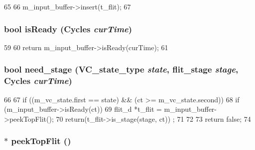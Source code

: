 \begin{DoxyCode}
65     {
66         m_input_buffer->insert(t_flit);
67     }
\end{DoxyCode}
\hypertarget{classVirtualChannel__d_ae19b07af91a49435139ba13f5665b239}{
\subsubsection[{isReady}]{\setlength{\rightskip}{0pt plus 5cm}bool isReady ({\bf Cycles} {\em curTime})}}
\label{classVirtualChannel__d_ae19b07af91a49435139ba13f5665b239}



\begin{DoxyCode}
59     {
60         return m_input_buffer->isReady(curTime);
61     }
\end{DoxyCode}
\hypertarget{classVirtualChannel__d_a960a054abffa235924cfa89f938c53df}{
\subsubsection[{need\_\-stage}]{\setlength{\rightskip}{0pt plus 5cm}bool need\_\-stage ({\bf VC\_\-state\_\-type} {\em state}, \/  {\bf flit\_\-stage} {\em stage}, \/  {\bf Cycles} {\em curTime})}}
\label{classVirtualChannel__d_a960a054abffa235924cfa89f938c53df}



\begin{DoxyCode}
66 {
67     if ((m_vc_state.first == state) && (ct >= m_vc_state.second)) {
68         if (m_input_buffer->isReady(ct)) {
69             flit_d *t_flit = m_input_buffer->peekTopFlit();
70             return(t_flit->is_stage(stage, ct)) ;
71         }
72     }
73     return false;
74 }
\end{DoxyCode}
\hypertarget{classVirtualChannel__d_ad04b660f0ff7b0e397beb261633f8b4e}{
\subsubsection[{peekTopFlit}]{$\ast$ peekTopFlit ()}}
\label{classVirtualChannel__d_ad04b660f0ff7b0e397beb261633f8b4e}



